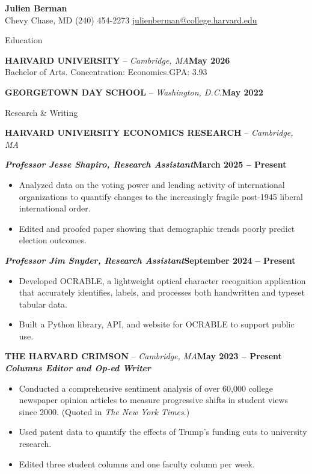 \documentclass[10pt,letterpaper]{article}
\newcommand{\resumeSection}[1]{\vspace{5pt}\begin{center}{#1}\end{center}\vspace{-2pt}}
\newcommand{\resumeEntry}[4]{\textbf{#1} -- \textit{#2}\hfill\textbf{#3}\\#4\vspace{1pt}}
\newcommand{\resumeRole}[2]{\hspace*{0.18in}\textbf{\textit{#1}}\hfill\textbf{#2}}
\begin{document}
\begin{center}
{\fontsize{14}{16}\selectfont\textbf{Julien Berman}}\\
Chevy Chase, MD \textbar{} (240) 454-2273 \textbar{} \href{mailto:julienberman@college.harvard.edu}{julienberman@college.harvard.edu}
\end{center}

\resumeSection{Education}

\resumeEntry{HARVARD UNIVERSITY}{Cambridge, MA}{May 2026}{Bachelor of Arts. Concentration: Economics.\hfill GPA: 3.93}

\resumeEntry{GEORGETOWN DAY SCHOOL}{Washington, D.C.}{May 2022}{}

\resumeSection{Research \& Writing}

\textbf{HARVARD UNIVERSITY ECONOMICS RESEARCH} -- \textit{Cambridge, MA}

\resumeRole{Professor Jesse Shapiro, Research Assistant}{March 2025 -- Present}
\begin{itemize}
  \item Analyzed data on the voting power and lending activity of international organizations to quantify changes to the increasingly fragile post-1945 liberal international order.
  \item Edited and proofed paper showing that demographic trends poorly predict election outcomes.
\end{itemize}

\resumeRole{Professor Jim Snyder, Research Assistant}{September 2024 -- Present}
\begin{itemize}
  \item Developed OCRABLE, a lightweight optical character recognition application that accurately identifies, labels, and processes both handwritten and typeset tabular data.
  \item Built a Python library, API, and website for OCRABLE to support public use.
\end{itemize}

\resumeEntry{THE HARVARD CRIMSON}{Cambridge, MA}{May 2023 -- Present}{\hspace*{0.18in}\textbf{\textit{Columns Editor and Op-ed Writer}}}
\begin{itemize}
  \item Conducted a comprehensive sentiment analysis of over 60,000 college newspaper opinion articles to measure progressive shifts in student views since 2000. (Quoted in \textit{The New York Times}.)
  \item Used patent data to quantify the effects of Trump's funding cuts to university research.
  \item Edited three student columns and one faculty column per week.
\end{itemize}
\end{document}
